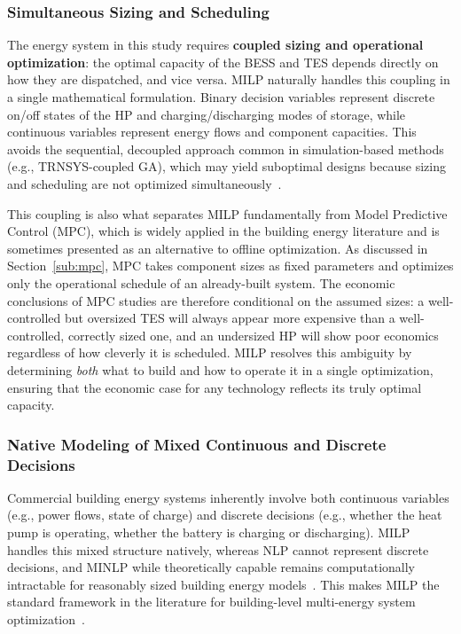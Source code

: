 \documentclass[11pt,a4paper]{report}
\begin{document}
\subsubsection*{Simultaneous Sizing and Scheduling}

The energy system in this study requires \textbf{coupled sizing and operational optimization}: the optimal capacity of the BESS and TES depends directly on how they are dispatched, and vice versa. MILP naturally handles this coupling in a single mathematical formulation. Binary decision variables represent discrete on/off states of the HP and charging/discharging modes of storage, while continuous variables represent energy flows and component capacities. This avoids the sequential, decoupled approach common in simulation-based methods (e.g., TRNSYS-coupled GA), which may yield suboptimal designs because sizing and scheduling are not optimized simultaneously~\cite{cardoso2014milp}.

This coupling is also what separates MILP fundamentally from Model Predictive Control (MPC), which is widely applied in the building energy literature and is sometimes presented as an alternative to offline optimization.
As discussed in Section~\ref{sub:mpc}, MPC takes component sizes as fixed parameters and optimizes only the operational schedule of an already-built system.
The economic conclusions of MPC studies are therefore conditional on the assumed sizes: a well-controlled but oversized TES will always appear more expensive than a well-controlled, correctly sized one, and an undersized HP will show poor economics regardless of how cleverly it is scheduled.
MILP resolves this ambiguity by determining \emph{both} what to build and how to operate it in a single optimization, ensuring that the economic case for any technology reflects its truly optimal capacity.

\subsubsection*{Native Modeling of Mixed Continuous and Discrete Decisions}

Commercial building energy systems inherently involve both continuous variables (e.g., power flows, state of charge) and discrete decisions (e.g., whether the heat pump is operating, whether the battery is charging or discharging). MILP handles this mixed structure natively, whereas NLP cannot represent discrete decisions, and MINLP while theoretically capable remains computationally intractable for reasonably sized building energy models~\cite{kotzur2018milp}. This makes MILP the standard framework in the literature for building-level multi-energy system optimization~\cite{beck2021milp}.
\end{document}
